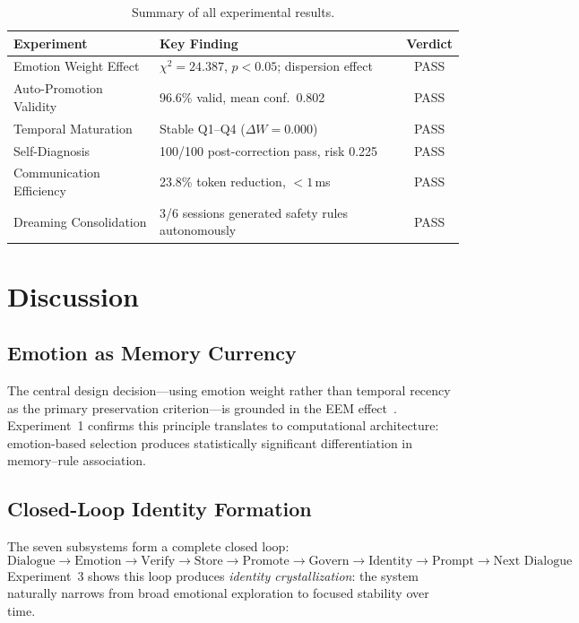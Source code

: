\documentclass[11pt,a4paper]{article}
\begin{document}
\begin{table}[h]
\centering
\caption{Summary of all experimental results.}
\label{tab:summary}
\small
\begin{tabular}{@{}llc@{}}
\toprule
\textbf{Experiment} & \textbf{Key Finding} & \textbf{Verdict} \\
\midrule
Emotion Weight Effect    & $\chi^2 = 24.387$, $p < 0.05$; dispersion effect  & PASS \\
Auto-Promotion Validity  & 96.6\% valid, mean conf.\ 0.802                   & PASS \\
Temporal Maturation      & Stable Q1--Q4 ($\Delta W = 0.000$)                & PASS \\
Self-Diagnosis           & 100/100 post-correction pass, risk 0.225          & PASS \\
Communication Efficiency & 23.8\% token reduction, $< 1$\,ms                & PASS \\
Dreaming Consolidation   & 3/6 sessions generated safety rules autonomously  & PASS \\
\bottomrule
\end{tabular}
\end{table}

\section{Discussion}

\subsection{Emotion as Memory Currency}

The central design decision---using emotion weight rather than temporal recency as the
primary preservation criterion---is grounded in the EEM effect~\citep{labar2006cognitive}.
Experiment~1 confirms this principle translates to computational architecture: emotion-based
selection produces statistically significant differentiation in memory--rule association.

\subsection{Closed-Loop Identity Formation}

The seven subsystems form a complete closed loop:
\[
\text{Dialogue} \to \text{Emotion} \to \text{Verify} \to \text{Store}
\to \text{Promote} \to \text{Govern} \to \text{Identity} \to \text{Prompt}
\to \text{Next Dialogue}
\]
Experiment~3 shows this loop produces \emph{identity crystallization}: the system naturally
narrows from broad emotional exploration to focused stability over time.
\end{document}
